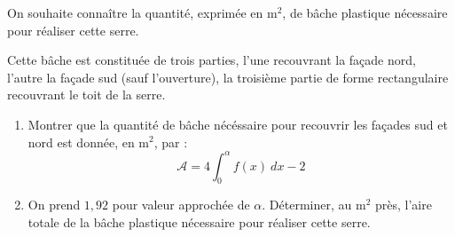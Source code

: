 \documentclass{cornouaille}
\begin{document}
\begin{exercice}
On souhaite connaître la quantité, exprimée en m$^2$, de bâche plastique nécessaire pour réaliser cette serre.

Cette bâche est constituée de trois parties, l'une recouvrant la façade nord, l'autre la façade sud (sauf l'ouverture), la troisième partie de forme rectangulaire recouvrant le toit de la serre.

\begin{enumerate}
	\item Montrer que la quantité de bâche nécéssaire pour recouvrir les façades sud et nord est donnée, en m$^2$, par : \[\mathcal{A}=4\int_0^{\alpha}f(x)\ dx-2\]
	\item On prend $1,92$ pour valeur approchée de $\alpha$. Déterminer, au m$^2$ près, l'aire totale de la bâche plastique nécessaire pour réaliser cette serre.
\end{enumerate}
\end{exercice}
\end{document}
